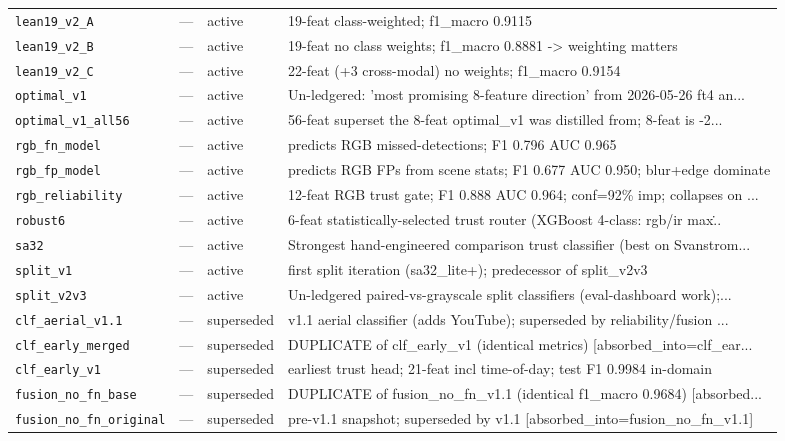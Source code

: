 \begin{longtable}{p{}llp{}}
\texttt{lean19\_v2\_A} & --- & active & 19-feat class-weighted; f1\_macro 0.9115 \\
\texttt{lean19\_v2\_B} & --- & active & 19-feat no class weights; f1\_macro 0.8881 -> weighting matters \\
\texttt{lean19\_v2\_C} & --- & active & 22-feat (+3 cross-modal) no weights; f1\_macro 0.9154 \\
\texttt{optimal\_v1} & --- & active & Un-ledgered: 'most promising 8-feature direction' from 2026-05-26 ft4 an... \\
\texttt{optimal\_v1\_all56} & --- & active & 56-feat superset the 8-feat optimal\_v1 was distilled from; 8-feat is -2... \\
\texttt{rgb\_fn\_model} & --- & active & predicts RGB missed-detections; F1 0.796 AUC 0.965 \\
\texttt{rgb\_fp\_model} & --- & active & predicts RGB FPs from scene stats; F1 0.677 AUC 0.950; blur+edge dominate \\
\texttt{rgb\_reliability} & --- & active & 12-feat RGB trust gate; F1 0.888 AUC 0.964; conf=92\% imp; collapses on ... \\
\texttt{robust6} & --- & active & 6-feat statistically-selected trust router (XGBoost 4-class: rgb/ir max\... \\
\texttt{sa32} & --- & active & Strongest hand-engineered comparison trust classifier (best on Svanstrom... \\
\texttt{split\_v1} & --- & active & first split iteration (sa32\_lite+); predecessor of split\_v2v3 \\
\texttt{split\_v2v3} & --- & active & Un-ledgered paired-vs-grayscale split classifiers (eval-dashboard work);... \\
\texttt{clf\_aerial\_v1.1} & --- & superseded & v1.1 aerial classifier (adds YouTube); superseded by reliability/fusion ... \\
\texttt{clf\_early\_merged} & --- & superseded & DUPLICATE of clf\_early\_v1 (identical metrics) [absorbed\_into=clf\_ear... \\
\texttt{clf\_early\_v1} & --- & superseded & earliest trust head; 21-feat incl time-of-day; test F1 0.9984 in-domain \\
\texttt{fusion\_no\_fn\_base} & --- & superseded & DUPLICATE of fusion\_no\_fn\_v1.1 (identical f1\_macro 0.9684) [absorbed... \\
\texttt{fusion\_no\_fn\_original} & --- & superseded & pre-v1.1 snapshot; superseded by v1.1 [absorbed\_into=fusion\_no\_fn\_v1.1] \\

\end{longtable}
